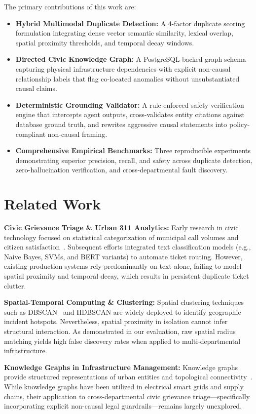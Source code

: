 \documentclass[conference]{IEEEtran}
\begin{document}
The primary contributions of this work are:
\begin{itemize}
    \item \textbf{Hybrid Multimodal Duplicate Detection:} A 4-factor duplicate scoring formulation integrating dense vector semantic similarity, lexical overlap, spatial proximity thresholds, and temporal decay windows.
    \item \textbf{Directed Civic Knowledge Graph:} A PostgreSQL-backed graph schema capturing physical infrastructure dependencies with explicit non-causal relationship labels that flag co-located anomalies without unsubstantiated causal claims.
    \item \textbf{Deterministic Grounding Validator:} A rule-enforced safety verification engine that intercepts agent outputs, cross-validates entity citations against database ground truth, and rewrites aggressive causal statements into policy-compliant non-causal framing.
    \item \textbf{Comprehensive Empirical Benchmarks:} Three reproducible experiments demonstrating superior precision, recall, and safety across duplicate detection, zero-hallucination verification, and cross-departmental fault discovery.
\end{itemize}

\section{Related Work}
\textbf{Civic Grievance Triage \& Urban 311 Analytics:} Early research in civic technology focused on statistical categorization of municipal call volumes and citizen satisfaction~\cite{b1, b2}. Subsequent efforts integrated text classification models (e.g., Naive Bayes, SVMs, and BERT variants) to automate ticket routing. However, existing production systems rely predominantly on text alone, failing to model spatial proximity and temporal decay, which results in persistent duplicate ticket clutter.

\textbf{Spatial-Temporal Computing \& Clustering:} Spatial clustering techniques such as DBSCAN~\cite{b3} and HDBSCAN are widely deployed to identify geographic incident hotspots. Nevertheless, spatial proximity in isolation cannot infer structural interaction. As demonstrated in our evaluation, raw spatial radius matching yields high false discovery rates when applied to multi-departmental infrastructure.

\textbf{Knowledge Graphs in Infrastructure Management:} Knowledge graphs provide structured representations of urban entities and topological connectivity~\cite{b4}. While knowledge graphs have been utilized in electrical smart grids and supply chains, their application to cross-departmental civic grievance triage---specifically incorporating explicit non-causal legal guardrails---remains largely unexplored.
\end{document}
